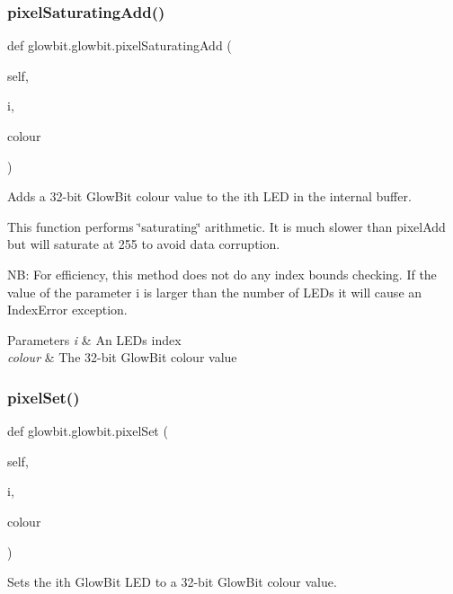 \subsubsection{\texorpdfstring{pixel\+Saturating\+Add()}{pixelSaturatingAdd()}}
{\footnotesize\ttfamily def glowbit.\+glowbit.\+pixel\+Saturating\+Add (\begin{DoxyParamCaption}\item[{}]{self,  }\item[{}]{i,  }\item[{}]{colour }\end{DoxyParamCaption})}



Adds a 32-\/bit Glow\+Bit colour value to the i\textquotesingle{}th L\+ED in the internal buffer. 

This function performs \char`\"{}saturating\char`\"{} arithmetic. It is much slower than pixel\+Add but will saturate at 255 to avoid data corruption.

NB\+: For efficiency, this method does not do any index bounds checking. If the value of the parameter i is larger than the number of L\+E\+Ds it will cause an Index\+Error exception.


\begin{DoxyParams}{Parameters}
{\em i} & An L\+ED\textquotesingle{}s index \\
\hline
{\em colour} & The 32-\/bit Glow\+Bit colour value \\
\hline
\end{DoxyParams}
\mbox{\label{classglowbit_1_1glowbit_a6184de87721652f9f55f9301f6a3a9ce}} 
\subsubsection{\texorpdfstring{pixel\+Set()}{pixelSet()}}
{\footnotesize\ttfamily def glowbit.\+glowbit.\+pixel\+Set (\begin{DoxyParamCaption}\item[{}]{self,  }\item[{}]{i,  }\item[{}]{colour }\end{DoxyParamCaption})}



Sets the i\textquotesingle{}th Glow\+Bit L\+ED to a 32-\/bit Glow\+Bit colour value. 

